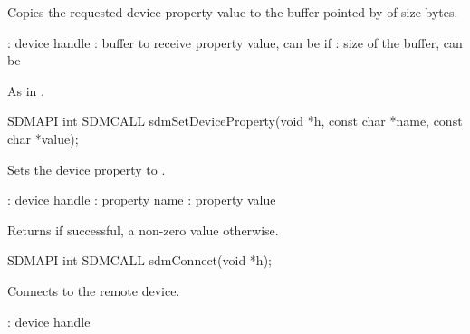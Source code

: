 \documentclass[a4paper,12pt,twoside,extrafontsizes]{memoir}
\begin{document}
\begin{funcdescr}
	Copies the requested device property value to the buffer pointed by  of size  bytes.
\end{funcdescr}

\begin{funcparams}
	: device handle
	: buffer to receive property value, can be  if 
	: size of the buffer, can be 
\end{funcparams}

\begin{funcret}
	As in .
\end{funcret}



\begin{cfuncprototype}
SDMAPI int SDMCALL sdmSetDeviceProperty(void *h, const char *name, const char *value);
\end{cfuncprototype}

\begin{funcdescr}
	Sets the device property  to .
\end{funcdescr}

\begin{funcparams}
	: device handle
	: property name
	: property value
\end{funcparams}

\begin{funcret}
	Returns  if successful, a non-zero value otherwise.
\end{funcret}



\begin{cfuncprototype}
SDMAPI int SDMCALL sdmConnect(void *h);
\end{cfuncprototype}

\begin{funcdescr}
	Connects to the remote device.
\end{funcdescr}

\begin{funcparams}
	: device handle
\end{funcparams}
\end{document}
